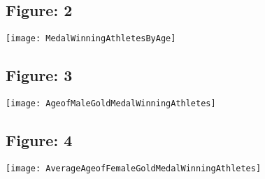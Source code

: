 \documentclass{article}
\begin{document}
\bigbreak

\begin{figure}[ht!]
\centering
\subsection{Figure: 2}
\centering
\texttt{[image: MedalWinningAthletesByAge]}
\end{figure}

\bigbreak

\begin{figure}[ht!]
\centering
\subsection{Figure: 3}
\centering
\texttt{[image: AgeofMaleGoldMedalWinningAthletes]}
\end{figure}

\bigbreak

\begin{figure}[ht!]
\centering
\subsection{Figure: 4}
\centering
\texttt{[image: AverageAgeofFemaleGoldMedalWinningAthletes]}
\end{figure}
\end{document}
